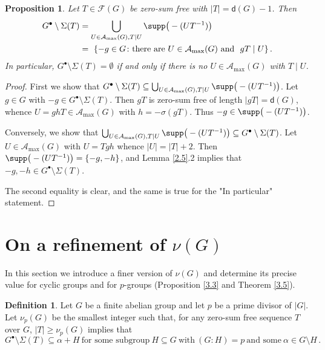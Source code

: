\documentclass[a4paper, 10pt]{amsart}
\theoremstyle{plain}
\newtheorem{proposition}[theorem]{\bf Proposition}
\theoremstyle{definition}
\newtheorem{definition}[theorem]{\bf Definition}
\numberwithin{equation}{section}
\begin{document}
\begin{proposition} \label{2.6}
Let $T\in \mathcal F (G)$ be zero-sum free with $|T|=\mathsf d (G)-1$. Then
\[
\begin{aligned}
G^{\bullet}\setminus \Sigma (T) & =\bigcup_{ U\in \mathcal A_{\max}(G), T \mid U } \supp \big(-(UT^{-1}) \big) \\
	& = \ \{-g\in G \colon \text{there are $U\in \mathcal A_{\max}(G)$ and } \ gT \mid U \} \,.
\end{aligned}
\]
In particular,  $G^{\bullet}\setminus \Sigma (T)=\emptyset$ if and only if there is no  $U\in \mathcal A_{\max}(G)$ with $T \mid U$.
\end{proposition}

\begin{proof}
First we show that $G^{\bullet}\setminus \Sigma (T)  \subseteq \bigcup_{ U\in \mathcal A_{\max}(G), T \mid U } \supp \big(-(UT^{-1}) \big)$. Let $g \in G$ with $-g \in G^{\bullet}\setminus \Sigma (T)$. Then $gT$ is zero-sum free of length $|gT|= \mathsf d (G)$, whence $U = ghT \in \mathcal A_{\max} (G)$  with $h = - \sigma (gT)$. Thus $-g \in \supp \big(-(UT^{-1}) \big)$.

Conversely, we show that $\bigcup_{ U\in \mathcal A_{\max}(G), T \mid U } \supp \big(-(UT^{-1}) \big) \subseteq G^{\bullet}\setminus \Sigma (T)$. Let $U \in \mathcal A_{\max} (G)$ with $U = Tgh$ whence $|U|=|T|+2$. Then $\supp \big(-(UT^{-1}) \big) = \{-g,-h\}$, and Lemma \ref{2.5}.2 implies that $-g,-h \in G^{\bullet}\setminus \Sigma (T)$.

The second equality is clear, and the same is true for the "In particular" statement.
\end{proof}


\smallskip
\section{On a refinement of $\nu (G)$} \label{3}
\smallskip


In this section we introduce a finer version of $\nu (G)$ and determine its precise value for cyclic groups and for $p$-groups (Proposition \ref{3.3} and Theorem \ref{3.5}).


\begin{definition} \label{3.1}
Let $G$ be a finite abelian group and let $p$ be a prime divisor of $|G|$. Let $\nu_p (G)$ be the smallest integer such that, for any zero-sum free sequence $T$ over $G$, $|T| \ge \nu_p (G)$ implies that 
\begin{equation} \label{def-nu_p(G)}
G^{\bullet} \setminus \Sigma (T) \subseteq \alpha + H \ \text{for some subgroup} \ H \subseteq G \ \text{with} \ (G \colon H) = p \ \text{and some} \ \alpha \in G \setminus H \,.
\end{equation}
\end{definition}
\end{document}
